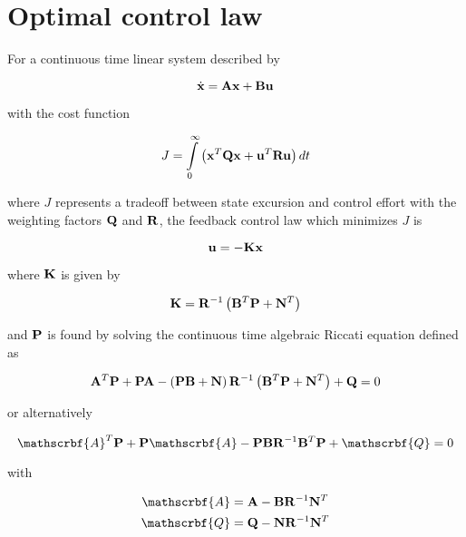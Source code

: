 \section{Optimal control law}
\label{sec:deriv_optimal_control_law}

For a continuous time linear \gls{system} described by

\begin{equation}
  \dot{\mathbf{x}} = \mathbf{A}\mathbf{x} + \mathbf{B}\mathbf{u}
\end{equation}

with the cost function

\begin{equation*}
  J = \int\limits_0^\infty \left(\mathbf{x}^T\mathbf{Q}\mathbf{x} +
    \mathbf{u}^T\mathbf{R}\mathbf{u}\right) dt
\end{equation*}

where $J$ represents a tradeoff between \gls{state} excursion and
\gls{control effort} with the weighting factors $\mathbf{Q}$ and $\mathbf{R}$, the
feedback \gls{control law} which minimizes $J$ is

\begin{equation*}
  \mathbf{u} = -\mathbf{K}\mathbf{x}
\end{equation*}

where $\mathbf{K}$ is given by

\begin{equation*}
  \mathbf{K} = \mathbf{R}^{-1} \left(\mathbf{B}^T\mathbf{P} + \mathbf{N}^T\right)
\end{equation*}

and $\mathbf{P}$ is found by solving the continuous time algebraic Riccati equation
defined as

\begin{equation*}
  \mathbf{A}^T\mathbf{P} + \mathbf{P}\mathbf{A} - \left(\mathbf{P}\mathbf{B} +
    \mathbf{N}\right) \mathbf{R}^{-1} \left(\mathbf{B}^T\mathbf{P} + \mathbf{N}^T\right) +
    \mathbf{Q} = 0
\end{equation*}

or alternatively

\begin{equation*}
  \mathscrbf{A}^T\mtx{P} + \mtx{P}\mathscrbf{A} -
    \mtx{P}\mtx{B}\mtx{R}^{-1}\mtx{B}^T\mtx{P} + \mathscrbf{Q} = 0
\end{equation*}

with

\begin{align*}
  \mathscrbf{A} &= \mtx{A} - \mtx{B}\mtx{R}^{-1}\mtx{N}^T \\
  \mathscrbf{Q} &= \mtx{Q} - \mtx{N}\mtx{R}^{-1}\mtx{N}^T
\end{align*}

